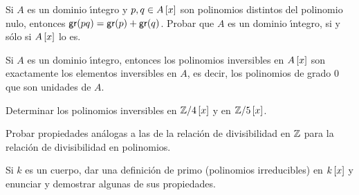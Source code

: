 \begin{ejerPolinomios}
	Si $A$ es un dominio \'{\i}ntegro y $p,q\in\polinomios[x] A$ son
	polinomios distintos del polinomio nulo, entonces
	$\grado(pq)=\grado(p)+\grado(q)$. Probar que $A$ es un dominio
	\'{\i}ntegro, si y s\'olo si $\polinomios[x] A$ lo es.
\end{ejerPolinomios}

\begin{ejerPolinomios}
	Si $A$ es un dominio \'{\i}ntegro, entonces los polinomios
	inversibles en $\polinomios[x] A$ son exactamente los elementos
	inversibles en $A$, es decir, los polinomios de grado $0$ que son
	unidades de $A$.
\end{ejerPolinomios}

\begin{ejerPolinomios}
	Determinar los polinomios inversibles en
	$\polinomios[x]{\simEnterosmod[4]}$ y en
	$\polinomios[x]{\simEnterosmod[5]}$.
\end{ejerPolinomios}

\begin{ejerPolinomios}\label{ejer:polinomios:divisibilidad}
	Probar propiedades an\'alogas a las de la relaci\'on de divisibilidad
	en $\Enteros$ para la relaci\'on de divisibilidad en polinomios.
\end{ejerPolinomios}

\begin{ejerPolinomios}\label{ejer:polinomios:irreducibles}
	Si $k$ es un cuerpo, dar una definici\'on de primo (polinomios
	irreducibles) en $\polinomios[x] k$ y enunciar y demostrar algunas
	de sus propiedades.
\end{ejerPolinomios}

